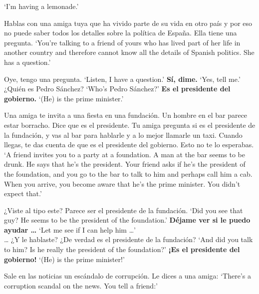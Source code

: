 \begin{exe}
\begin{xlist}[A:]
	\glt `I'm having a lemonade.' 
	\end{xlist}
\ex \label{ex:experimentoNEUTRALDECLgobierno_APP}
	Hablas con una amiga tuya que ha vivido parte de su vida en otro país y por eso no puede saber todos los detalles sobre la política de España. Ella tiene una pregunta. 
	\glt `You're talking to a friend of yours who has lived part of her life in another country and therefore cannot know all the details of Spanish politics. She has a question.' 
	\begin{xlist}[A:]
	 Oye, tengo una pregunta. \href{https://osf.io/whnsu/}{\faVolumeUp} 
	\glt `Listen, I have a question.' 
	 \textbf{Sí, dime.} 
	\glt `Yes, tell me.' 
	 ¿Quién es Pedro Sánchez? \href{https://osf.io/3uw7x/}{\faVolumeUp}
	\glt `Who's Pedro Sánchez?' 
	 \textbf{Es el presidente del gobierno.} 
	\glt `(He) is the prime minister.' 
	\end{xlist}
\ex \label{ex:experimentoMIRDECLgobierno_APP}
	Una amiga te invita a una fiesta en una fundación. Un hombre en el bar parece estar borracho. Dice que es el presidente. Tu amiga pregunta si es el presidente de la fundación, y vas al bar para hablarle y a lo mejor llamarle un taxi. Cuando llegas, te das cuenta de que es el presidente del gobierno. Esto no te lo esperabas.  
	\glt `A friend invites you to a party at a foundation. A man at the bar seems to be drunk. He says that he's the president. Your friend asks if he's the president of the foundation, and you go to the bar to talk to him and perhaps call him a cab. When you arrive, you become aware that he's the prime minister. You didn't expect that.' 
	\begin{xlist}[A:]
	 ¿Viste al tipo este? Parece ser el presidente de la fundación. 
	\glt `Did you see that guy? He seems to be the president of the foundation.' \href{https://osf.io/6ytnk/}{\faVolumeUp}
	 \textbf{Déjame ver si le puedo ayudar \ldots} 
	\glt `Let me see if I can help him \ldots'\\
	\ldots
	 ¿Y le hablaste? ¿De verdad es el presidente de la fundación?  
	\glt `And did you talk to him? Is he really the president of the foundation?'  \href{https://osf.io/92hp4/}{\faVolumeUp}
	 \textbf{¡Es el presidente del gobierno!} 
	\glt `(He) is the prime minister!'
	\end{xlist}
\ex \label{ex:experimentoWHEXCLgobierno_APP}
	Sale en las noticias un escándalo de corrupción. Le dices a una amiga: 
	\glt `There's a corruption scandal on the news. You tell a friend:' 
	\begin{xlist}[A:]

\end{xlist}
\end{exe}
